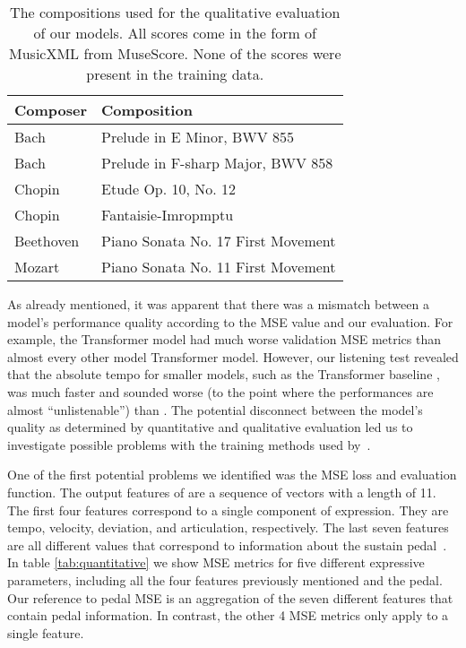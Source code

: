 \begin{table}
    \setlength{\extrarowheight}{3pt}
    \begin{center}
    \begin{tabular}[]{| l | l |}
        \hline
        Composer & Composition \\ 
        \hline 
        Bach & Prelude in E Minor, BWV 855 \\
        Bach & Prelude in F-sharp Major, BWV 858  \\ 
        Chopin & Etude Op. 10, No. 12 \\ 
        Chopin & Fantaisie-Imropmptu \\ 
        Beethoven & Piano Sonata No. 17 First Movement \\ 
        Mozart & Piano Sonata No. 11 First Movement \\ 
        \hline
    \end{tabular}
    \caption{The compositions used for the qualitative evaluation of our models. All scores come in the form of MusicXML from MuseScore. None of the scores were present in the training data.}
    \label{tab:compositions}
    \end{center}
\end{table}

As already mentioned, it was apparent that there was a mismatch between a model's performance quality according to the MSE value and our evaluation. For example, the Transformer model    had much worse validation MSE metrics than almost every other model Transformer model. However, our listening test revealed that the absolute tempo for smaller models, such as the Transformer baseline , was much faster and sounded worse (to the point where the performances are almost ``unlistenable'') than . The potential disconnect between the model's quality as determined by quantitative and qualitative evaluation led us to investigate possible problems with the training methods used by~\citet{jeong2019virtuosonet}. 

One of the first potential problems we identified was the MSE loss and evaluation function. The output features of \vnet{} are a sequence of vectors with a length of 11. The first four features correspond to a single component of expression. They are tempo, velocity, deviation, and articulation, respectively. The last seven features are all different values that correspond to information about the sustain pedal~\cite{jeong2019score}. In table \ref{tab:quantitative} we show MSE metrics for five different expressive parameters, including all the four features previously mentioned and the pedal. Our reference to pedal MSE is an aggregation of the seven different features that contain pedal information. In contrast, the other 4 MSE metrics only apply to a single feature.

